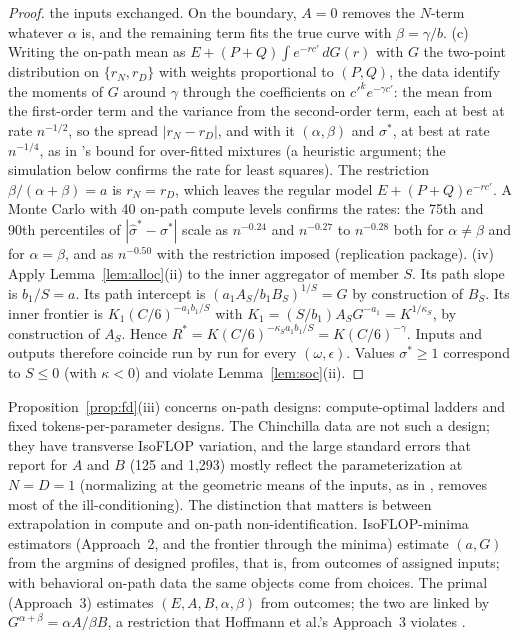 \begin{proof}
the inputs exchanged. On the boundary, $A=0$ removes the $N$-term whatever $\alpha$ is, and the remaining term fits the true
curve with $\beta=\gamma/b$.
(c) Writing the on-path mean as $E+(P+Q)\int e^{-rc'}\,dG(r)$ with $G$ the two-point distribution on $\{r_N,r_D\}$ with
weights proportional to $(P,Q)$, the data identify the moments of $G$ around $\gamma$ through the coefficients on
$c'^ke^{-\gamma c'}$: the mean from the first-order term and the variance from the second-order term, each at best at rate
$n^{-1/2}$, so the spread $|r_N-r_D|$, and with it $(\alpha,\beta)$ and $\sigma^*$, at best at rate $n^{-1/4}$, as in
\citeauthor{chen1995optimal}'s bound for over-fitted mixtures (a heuristic argument; the simulation below confirms the rate
for least squares). The restriction $\beta/(\alpha+\beta)=a$ is $r_N=r_D$, which leaves the regular model $E+(P+Q)e^{-rc'}$. A Monte Carlo with 40 on-path compute levels confirms the rates: the 75th and
90th percentiles of $|\hat\sigma^*-\sigma^*|$ scale as $n^{-0.24}$ and $n^{-0.27}$ to $n^{-0.28}$ both for
$\alpha\neq\beta$ and for $\alpha=\beta$, and as $n^{-0.50}$ with the restriction imposed (replication package).
(iv) Apply Lemma~\ref{lem:alloc}(ii) to the inner aggregator of member $S$. Its path slope is $b_1/S=a$. Its path
intercept is $(a_1A_S/b_1B_S)^{1/S}=G$ by construction of $B_S$. Its inner frontier is $K_1(C/6)^{-a_1b_1/S}$ with
$K_1=(S/b_1)A_SG^{-a_1}=K^{1/\kappa_S}$, by construction of $A_S$. Hence $R^*=K(C/6)^{-\kappa_Sa_1b_1/S}=K(C/6)^{-\gamma}$.
Inputs and outputs therefore coincide run by run for every $(\omega,\epsilon)$. Values $\sigma^*\ge1$ correspond to
$S\le0$ (with $\kappa<0$) and violate Lemma~\ref{lem:soc}(ii).
\end{proof}

\begin{remark}
Proposition~\ref{prop:fd}(iii) concerns on-path designs: compute-optimal ladders and fixed tokens-per-parameter designs.
The Chinchilla data are not such a design; they have transverse IsoFLOP variation, and the large standard errors that
\citet{besiroglu2024chinchilla} report for $A$ and $B$ (125 and 1,293) mostly reflect the parameterization at $N=D=1$
(normalizing at the geometric means of the inputs, as in \citealp{klump2007factor}, removes most of the ill-conditioning).
The distinction that matters is between extrapolation in compute and on-path non-identification. IsoFLOP-minima
estimators (Approach~2, and the frontier through the minima) estimate $(a,G)$ from the argmins of designed profiles, that
is, from outcomes of assigned inputs; with behavioral on-path data the same objects come from choices. The primal
(Approach~3) estimates $(E,A,B,\alpha,\beta)$ from outcomes; the two are linked by $G^{\alpha+\beta}=\alpha A/\beta B$, a
restriction that Hoffmann et al.'s Approach~3 violates \citep{hoffmann2022training}.
\end{remark}

